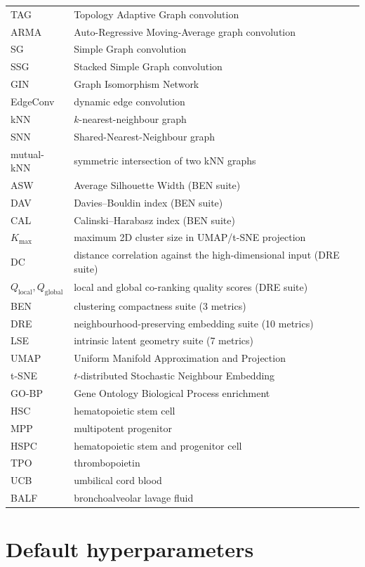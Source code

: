 \documentclass[referee, pdflatex, sn-vancouver-num]{sn-jnl}
\begin{document}
\begin{appendices}
\begin{longtable}{>{\raggedright\arraybackslash}p{2.8cm}>{\raggedright\arraybackslash}p{10.6cm}}
TAG & Topology Adaptive Graph convolution \\
ARMA & Auto-Regressive Moving-Average graph convolution \\
SG & Simple Graph convolution \\
SSG & Stacked Simple Graph convolution \\
GIN & Graph Isomorphism Network \\
EdgeConv & dynamic edge convolution \\
kNN & $k$-nearest-neighbour graph \\
SNN & Shared-Nearest-Neighbour graph \\
mutual-kNN & symmetric intersection of two kNN graphs \\
ASW & Average Silhouette Width (BEN suite) \\
DAV & Davies--Bouldin index (BEN suite) \\
CAL & Calinski--Harabasz index (BEN suite) \\
$K_{\max}$ & maximum 2D cluster size in UMAP/t-SNE projection \\
DC & distance correlation against the high-dimensional input (DRE suite) \\
$Q_{\text{local}}, Q_{\text{global}}$ & local and global co-ranking quality scores (DRE suite) \\
BEN & clustering compactness suite (3 metrics) \\
DRE & neighbourhood-preserving embedding suite (10 metrics) \\
LSE & intrinsic latent geometry suite (7 metrics) \\
UMAP & Uniform Manifold Approximation and Projection \\
t-SNE & $t$-distributed Stochastic Neighbour Embedding \\
GO-BP & Gene Ontology Biological Process enrichment \\
HSC & hematopoietic stem cell \\
MPP & multipotent progenitor \\
HSPC & hematopoietic stem and progenitor cell \\
TPO & thrombopoietin \\
UCB & umbilical cord blood \\
BALF & bronchoalveolar lavage fluid \\
\end{longtable}
\endgroup

\section{Default hyperparameters}\label{app:hyperparams}


\end{appendices}
\end{document}
